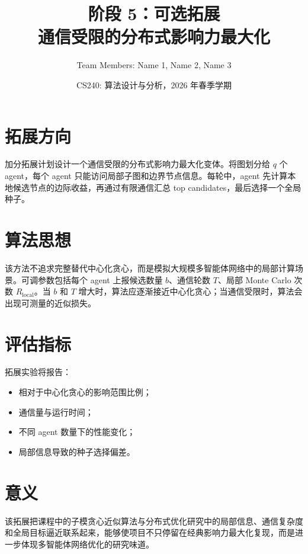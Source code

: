 \documentclass[UTF8, 11pt]{ctexart}
\title{\textbf{阶段 5：可选拓展}\\
通信受限的分布式影响力最大化}
\author{Team Members: Name 1, Name 2, Name 3}
\date{CS240: 算法设计与分析，2026 年春季学期}
\begin{document}
\maketitle

\section{拓展方向}

加分拓展计划设计一个通信受限的分布式影响力最大化变体。将图划分给 $q$ 个 agent，每个 agent 只能访问局部子图和边界节点信息。每轮中，agent 先计算本地候选节点的边际收益，再通过有限通信汇总 top candidates，最后选择一个全局种子。

\section{算法思想}

该方法不追求完整替代中心化贪心，而是模拟大规模多智能体网络中的局部计算场景。可调参数包括每个 agent 上报候选数量 $b$、通信轮数 $T$、局部 Monte Carlo 次数 $R_{\text{local}}$。当 $b$ 和 $T$ 增大时，算法应逐渐接近中心化贪心；当通信受限时，算法会出现可测量的近似损失。

\section{评估指标}

拓展实验将报告：
\begin{itemize}
    \item 相对于中心化贪心的影响范围比例；
    \item 通信量与运行时间；
    \item 不同 agent 数量下的性能变化；
    \item 局部信息导致的种子选择偏差。
\end{itemize}

\section{意义}

该拓展把课程中的子模贪心近似算法与分布式优化研究中的局部信息、通信复杂度和全局目标逼近联系起来，能够使项目不只停留在经典影响力最大化复现，而是进一步体现多智能体网络优化的研究味道。
\end{document}
